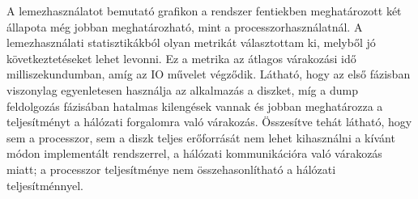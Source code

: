 A lemezhasználatot bemutató grafikon a rendszer fentiekben meghatározott két állapota még jobban meghatározható, mint a processzorhasználatnál. A lemezhasználati statisztikákból olyan metrikát választottam ki, melyből jó következtetéseket lehet levonni. Ez a metrika az átlagos várakozási idő milliszekundumban, amíg az IO művelet végződik. Látható, hogy az első fázisban viszonylag egyenletesen használja az alkalmazás a diszket, míg a dump feldolgozás fázisában hatalmas kilengések vannak és jobban meghatározza a teljesítményt a hálózati forgalomra való várakozás. Összesítve tehát látható, hogy sem a processzor, sem a diszk teljes erőforrását nem lehet kihasználni a kívánt módon implementált rendszerrel, a hálózati kommunikációra való várakozás miatt; a processzor teljesítménye nem összehasonlítható a hálózati teljesítménnyel.


